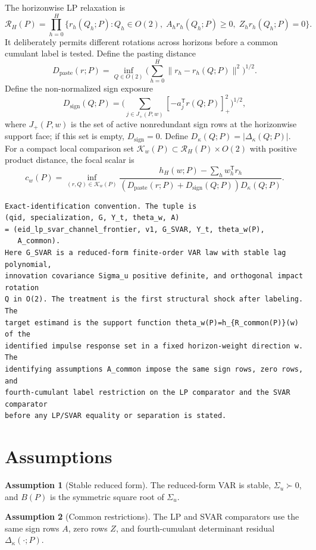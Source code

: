 \documentclass[11pt]{article}
\newcommand{\transpose}{\mathsf{T}}
\theoremstyle{definition}
\newtheorem{assumption}{Assumption}
\theoremstyle{plain}
\theoremstyle{remark}
\begin{document}
The horizonwise LP relaxation is
\[
\mathcal R_H(P)=\prod_{h=0}^H
\{r_h(Q_h;P): Q_h\in O(2),\; A_h r_h(Q_h;P)\ge0,\; Z_h r_h(Q_h;P)=0\}.
\]
It deliberately permits different rotations across horizons before a common
cumulant label is tested. Define the pasting distance
\[
D_{\mathrm{paste}}(r;P)=\inf_{Q\in O(2)}
\Big(\sum_{h=0}^H \|r_h-r_h(Q;P)\|^2\Big)^{1/2}.
\]
Define the non-normalized sign exposure
\[
D_{\mathrm{sign}}(Q;P)=
\Big(\sum_{j\in J_+(P,w)} [ -a_j^\transpose r(Q;P)]_+^2\Big)^{1/2},
\]
where \(J_+(P,w)\) is the set of active nonredundant sign rows at the
horizonwise support face; if this set is empty, \(D_{\mathrm{sign}}=0\). Define
\(D_\kappa(Q;P)=|\Delta_\kappa(Q;P)|\). For a compact local comparison set
\(\mathcal K_w(P)\subset \mathcal R_H(P)\times O(2)\) with positive product
distance, the focal scalar is
\[
c_w(P)=
\inf_{(r,Q)\in\mathcal K_w(P)}
\frac{h_H(w;P)-\sum_h w_h^\transpose r_h}
{(D_{\mathrm{paste}}(r;P)+D_{\mathrm{sign}}(Q;P))D_\kappa(Q;P)}.
\]

\begin{verbatim}
Exact-identification convention. The tuple is
(qid, specialization, G, Y_t, theta_w, A)
= (eid_lp_svar_channel_frontier, v1, G_SVAR, Y_t, theta_w(P),
   A_common).
Here G_SVAR is a reduced-form finite-order VAR law with stable lag polynomial,
innovation covariance Sigma_u positive definite, and orthogonal impact rotation
Q in O(2). The treatment is the first structural shock after labeling. The
target estimand is the support function theta_w(P)=h_{R_common(P)}(w) of the
identified impulse response set in a fixed horizon-weight direction w. The
identifying assumptions A_common impose the same sign rows, zero rows, and
fourth-cumulant label restriction on the LP comparator and the SVAR comparator
before any LP/SVAR equality or separation is stated.
\end{verbatim}

\section{Assumptions}
\begin{assumption}[Stable reduced form]\label{ass:stable}
The reduced-form VAR is stable, \(\Sigma_u\succ0\), and \(B(P)\) is the
symmetric square root of \(\Sigma_u\).
\end{assumption}

\begin{assumption}[Common restrictions]\label{ass:common}
The LP and SVAR comparators use the same sign rows \(A\), zero rows \(Z\), and
fourth-cumulant determinant residual \(\Delta_\kappa(\cdot;P)\).
\end{assumption}
\end{document}
